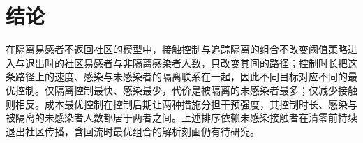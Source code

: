 \section{结论}
\label{sec:conclusion}
在隔离易感者不返回社区的模型中，接触控制与追踪隔离的组合不改变阈值策略进入与退出时的社区易感者与非隔离感染者人数，只改变其间的路径；控制时长把这条路径上的速度、感染与未感染者的隔离联系在一起，因此不同目标对应不同的最优控制。仅隔离控制最快、感染最少，代价是被隔离的未感染者最多；仅减少接触则相反。成本最优控制在控制后期让两种措施分担干预强度，其控制时长、感染与被隔离的未感染者人数都居于两者之间。上述排序依赖未感染接触者在清零前持续退出社区传播，含回流时最优组合的解析刻画仍有待研究。
